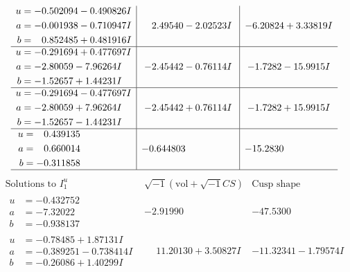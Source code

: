 \documentclass[1p]{elsarticle_modified}
\theoremstyle{definition}
\newcommand{\I}{\sqrt{-1}}
\begin{document}
$$\begin{array}{c|c|c}
\begin{aligned}
u &= -0.502094 - 0.490826 I \\
a &= -0.001938 - 0.710947 I \\
b &= \phantom{-}0.852485 + 0.481916 I\end{aligned}
 & \phantom{-}2.49540 - 2.02523 I & -6.20824 + 3.33819 I \\ \hline\begin{aligned}
u &= -0.291694 + 0.477697 I \\
a &= -2.80059 - 7.96264 I \\
b &= -1.52657 + 1.44231 I\end{aligned}
 & -2.45442 - 0.76114 I & -1.7282 - 15.9915 I \\ \hline\begin{aligned}
u &= -0.291694 - 0.477697 I \\
a &= -2.80059 + 7.96264 I \\
b &= -1.52657 - 1.44231 I\end{aligned}
 & -2.45442 + 0.76114 I & -1.7282 + 15.9915 I \\ \hline\begin{aligned}
u &= \phantom{-}0.439135\phantom{ +0.000000I} \\
a &= \phantom{-}0.660014\phantom{ +0.000000I} \\
b &= -0.311858\phantom{ +0.000000I}\end{aligned}
 & -0.644803\phantom{ +0.000000I} & -15.2830\phantom{ +0.000000I}\\
 \hline 
 \end{array}$$\newpage$$\begin{array}{c|c|c}  
\text{Solutions to }I^u_{1}& \I (\text{vol} + \sqrt{-1}CS) & \text{Cusp shape}\\
 \hline 
\begin{aligned}
u &= -0.432752\phantom{ +0.000000I} \\
a &= -7.32022\phantom{ +0.000000I} \\
b &= -0.938137\phantom{ +0.000000I}\end{aligned}
 & -2.91990\phantom{ +0.000000I} & -47.5300\phantom{ +0.000000I} \\ \hline\begin{aligned}
u &= -0.78485 + 1.87131 I \\
a &= -0.389251 - 0.738414 I \\
b &= -0.26086 + 1.40299 I\end{aligned}
 & \phantom{-}11.20130 + 3.50827 I & -11.32341 - 1.79574 I \\ \hline\begin{aligned}

\end{aligned}
\end{array}$$
\end{document}
